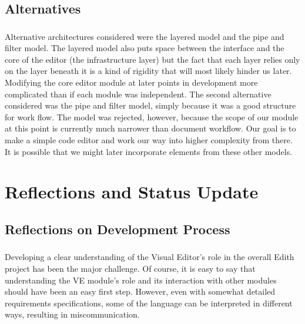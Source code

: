 \documentclass{llncs}
\begin{document}
\subsection{Alternatives}
\subsubsection{}
Alternative architectures considered were the layered model and the pipe and filter model. The layered model also puts space between the interface and the core of the editor (the infrastructure layer) but the fact that each layer relies only on the layer beneath it is a kind of rigidity that will most likely hinder us later. Modifying the core editor module at later points in development more complicated than if each module was independent. The second alternative considered was the pipe and filter model, simply because it was a good structure for work flow. The model was rejected, however, because the scope of our module at this point is currently much narrower than document workflow. Our goal is to make a simple code editor and work our way into higher complexity from there. It is possible that we might later incorporate elements from these other models.


\section{Reflections and Status Update}

\subsection{Reflections on Development Process}
\subsubsection{}
Developing a clear understanding of the Visual Editor’s role in the overall Edith project has been the major challenge.   Of course, it is easy to say that understanding the VE module’s role and its interaction with other modules should have been an easy first step.  However, even with somewhat detailed requirements specifications, some of the language can be interpreted in different ways, resulting in miscommunication.  
\end{document}
